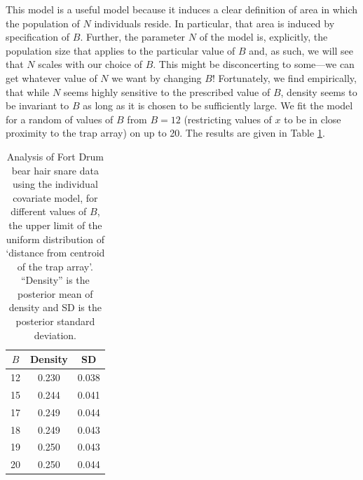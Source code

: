 This model is a useful model because it induces a clear definition of area
in which the population of $N$ individuals reside. In particular, 
that area is induced by specification of $B$.
Further, the parameter $N$ of the model is, explicitly, the
population size that applies to the particular value of $B$ and,
as such, we will see that $N$ scales with our choice of $B$.
This might be disconcerting to some---we can get whatever value of
$N$ we want by changing $B$!
Fortunately, we find empirically, that while $N$ seems
highly sensitive to the prescribed value of $B$, density seems to
be invariant to $B$ as long as it is chosen to be sufficiently
large. We fit the model for a random of values of $B$ from $B=12$ (restricting
values of $x$ to be in close proximity to
the trap array) on up to 20. The results are given in Table
\ref{closed.tab.Dmax}.

\begin{table}
\centering
\caption{Analysis of Fort Drum bear hair snare data using the
  individual covariate model, for different values of $B$, the upper
  limit of the uniform distribution of `distance from centroid of the
  trap array'. ``Density'' is the posterior mean of density and SD is
  the posterior standard deviation.}
\begin{tabular}{ccc}
\hline %
 $B$ & Density & SD \\ \hline
  12& 0.230 & 0.038 \\
  15& 0.244 &0.041 \\
  17& 0.249 &0.044 \\
  18& 0.249 &0.043\\
  19& 0.250 &0.043\\
  20& 0.250 &0.044 \\
\hline
\end{tabular}
\label{closed.tab.Dmax}
\end{table}


